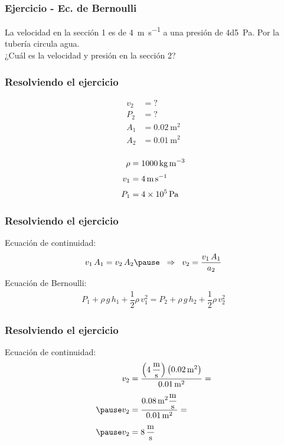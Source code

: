 \documentclass[14pt]{beamer}
\begin{document}
\begin{frame}
\frametitle{Ejercicio - Ec. de Bernoulli}
La velocidad en la sección 1 es de \SI[per-mode=symbol]{4}{\meter\per\second} a una presión de \SI{4d5}{\pascal}. Por la tubería circula agua.
\\
\bigskip
\pause
¿Cuál es la velocidad y presión en la sección 2?
\end{frame}
\begin{frame}
\frametitle{Resolviendo el ejercicio}
\vspace*{-1cm}
\begin{minipage}[t]{0.4\linewidth}
\begin{align*}
v_{2} &= ? \\[0.25em]
P_{2} &= ? \\[0.25em]
A_{1} &= \SI{0.02}{\square\meter} \\[0.25em]
A_{2} &= \SI{0.01}{\square\meter} \\[0.25em]
\end{align*}
\end{minipage}
\begin{minipage}[t]{0.4\linewidth}
\begin{align*}
\rho &= \SI{1000}{\kilo\gram\per\cubic\meter} \\[0.25em]
v_{1} &= \SI{4}{\meter\per\second} \\[0.25em]
P_{1} &= \SI{4d5}{\pascal}
\end{align*}
\end{minipage}
\end{frame}
\begin{frame}
\frametitle{Resolviendo el ejercicio}
 Ecuación de continuidad:
\pause
\begin{eqnarray*}
\begin{aligned}
v_{1} \, A_{1} = v_{2} \, A_{2} \pause \hspace*{0.2cm} \Rightarrow \hspace*{0.2cm} v_{2} = \dfrac{v_{1} \, A_{1}}{a_{2}}
\end{aligned}
\end{eqnarray*}
\pause
Ecuación de Bernoulli:
\pause
\begin{align*}
P_{1} + \rho \, g \, h_{1} + \dfrac{1}{2} \rho \, v_{1}^{2} = P_{2} + \rho \, g \, h_{2} + \dfrac{1}{2} \rho \, v_{2}^{2}
\end{align*}
\end{frame}
\begin{frame}
\frametitle{Resolviendo el ejercicio}
 Ecuación de continuidad:
\pause
\begin{eqnarray*}
\begin{aligned}
v_{2} &= \dfrac{\left( \displaystyle \SI[per-mode=fraction]{4}{\meter\per\second}\right) \left( \SI{0.02}{\square\meter}\right)}{\SI{0.01}{\square\meter}} = \\[0.5em] \pause
v_{2} &= \dfrac{ \displaystyle \SI{0.08}{\square\meter} \unit[per-mode=fraction]{\meter\per\second}}{\SI{0.01}{\square\meter}} =  \\[0.5em] \pause
v_{2} &= \SI[per-mode=fraction]{8}{\meter\per\second}
\end{aligned}
\end{eqnarray*}
\end{frame}
\end{document}
